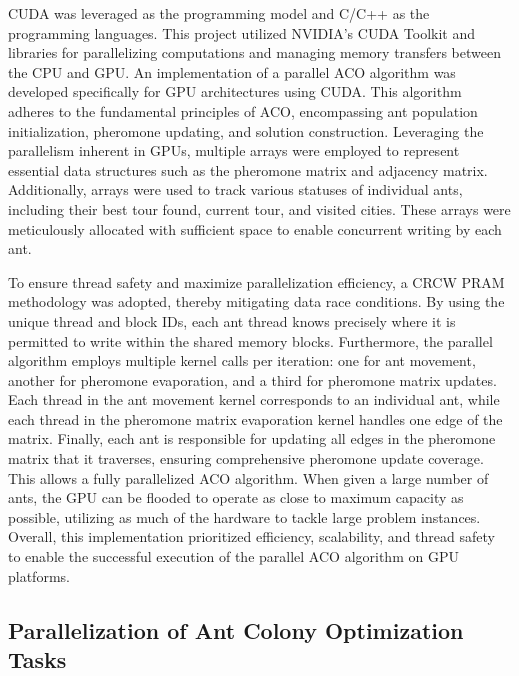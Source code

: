 \documentclass[11pt]{report}
\begin{document}
            CUDA was leveraged as the programming model and C/C++ as the programming languages. This project utilized NVIDIA's CUDA Toolkit and libraries for parallelizing computations and managing memory transfers between the CPU and GPU. An implementation of a parallel ACO algorithm was developed specifically for GPU architectures using CUDA. This algorithm adheres to the fundamental principles of ACO, encompassing ant population initialization, pheromone updating, and solution construction. Leveraging the parallelism inherent in GPUs, multiple arrays were employed to represent essential data structures such as the pheromone matrix and adjacency matrix. Additionally, arrays were used to track various statuses of individual ants, including their best tour found, current tour, and visited cities. These arrays were meticulously allocated with sufficient space to enable concurrent writing by each ant. 
            
            To ensure thread safety and maximize parallelization efficiency, a CRCW PRAM methodology was adopted, thereby mitigating data race conditions. By using the unique thread and block IDs, each ant thread knows precisely where it is permitted to write within the shared memory blocks. Furthermore, the parallel algorithm employs multiple kernel calls per iteration: one for ant movement, another for pheromone evaporation, and a third for pheromone matrix updates. Each thread in the ant movement kernel corresponds to an individual ant, while each thread in the pheromone matrix evaporation kernel handles one edge of the matrix. Finally, each ant is responsible for updating all edges in the pheromone matrix that it traverses, ensuring comprehensive pheromone update coverage. This allows a fully parallelized ACO algorithm. When given a large number of ants, the GPU can be flooded to operate as close to maximum capacity as possible, utilizing as much of the hardware to tackle large problem instances. Overall, this implementation prioritized efficiency, scalability, and thread safety to enable the successful execution of the parallel ACO algorithm on GPU platforms.
        
        \subsection{Parallelization of Ant Colony Optimization Tasks}
\end{document}
